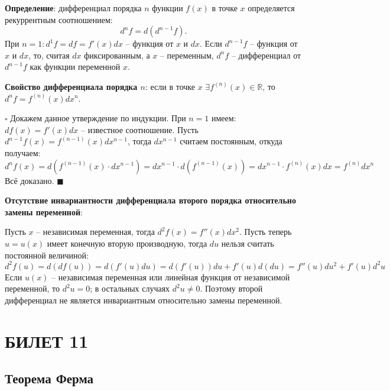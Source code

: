\documentclass[12pt, a4paper, reqno]{article}
\begin{document}
    \textbf{Определение}: дифференциал порядка $n$ функции $f(x)$ в точке $x$ определяется
    рекуррентным соотношением:
    \begin{equation*}
        d^nf = d(d^{n-1}f).
    \end{equation*}
    При $n = 1: d^1f = df = f'(x)dx$ -- функция от $x$ и $dx$. Если $d^{n-1}f$ -- функция от $x$ и
    $dx$, то, считая $dx$ фиксированным, а $x$ -- переменным, $d^nf$ -- дифференциал от $d^{n-1}f$
    как функции переменной $x$.

    \textbf{Свойство дифференциала порядка $n$}: если в точке $x$ $\exists f^{(n)}(x)\in\mathbb{R}$,
    то $d^nf = f^{(n)}(x)dx^n$.

    $\square$ Докажем данное утверждение по индукции. При $n = 1$ имеем: $df(x) = f'(x)dx$ --
    известное соотношение. Пусть $d^{n - 1}f(x) = f^{(n - 1)}(x)dx^{n - 1}$, тогда $dx^{n - 1}$
    считаем постоянным, откуда получаем:
    \begin{equation*}
        d^nf(x) = d\left(f^{(n - 1)}(x) \cdot dx^{n - 1}\right) =
        dx^{n - 1} \cdot d\left(f^{(n - 1)}(x)\right) =
        dx^{n - 1} \cdot f^{(n)}(x)dx = f^{(n)}dx^{n}
    \end{equation*}
    Всё доказано. $\blacksquare$

    \textbf{Отсутствие инвариантности дифференциала второго порядка относительно замены переменной}:

    Пусть $x$ -- независимая переменная, тогда $d^2f(x) = f''(x)dx^2$. Пусть теперь $u = u(x)$ имеет
    конечную вторую производную, тогда $du$ нельзя считать постоянной величиной:
    \begin{equation*}
        d^2f(u) = d\left(df(u)\right) = d\left(f'(u)du\right) = d\left(f'(u)\right)du + f'(u)d(du)
        = f''(u)du^2 + f'(u)d^2u
    \end{equation*}
    Если $u(x)$ -- независимая переменная или линейная функция от независимой переменной, то
    $d^2u = 0$; в остальных случаях $d^2u \neq 0$. Поэтому второй дифференциал не является
    инвариантным относительно замены переменной.

\newpage
\section{БИЛЕТ 11}

\subsection{Теорема Ферма}
\end{document}
